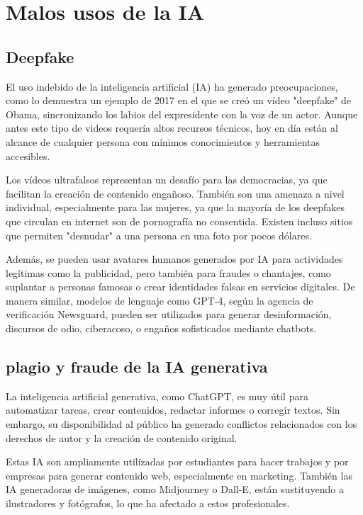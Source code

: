 \documentclass[12pt]{article}
\begin{document}
\section{Malos usos de la IA}

\subsection{Deepfake}

El uso indebido de la inteligencia artificial (IA) ha generado preocupaciones, como lo demuestra un ejemplo de 2017 en el que se creó un vídeo "deepfake" de Obama, sincronizando los labios del expresidente con la voz de un actor. Aunque antes este tipo de videos requería altos recursos técnicos, hoy en día están al alcance de cualquier persona con mínimos conocimientos y herramientas accesibles.

Los vídeos ultrafalsos representan un desafío para las democracias, ya que facilitan la creación de contenido engañoso. También son una amenaza a nivel individual, especialmente para las mujeres, ya que la mayoría de los deepfakes que circulan en internet son de pornografía no consentida. Existen incluso sitios que permiten "desnudar" a una persona en una foto por pocos dólares.

Además, se pueden usar avatares humanos generados por IA para actividades legítimas como la publicidad, pero también para fraudes o chantajes, como suplantar a personas famosas o crear identidades falsas en servicios digitales. De manera similar, modelos de lenguaje como GPT-4, según la agencia de verificación Newsguard, pueden ser utilizados para generar desinformación, discursos de odio, ciberacoso, o engaños sofisticados mediante chatbots.

\subsection{plagio y fraude de la IA generativa}

La inteligencia artificial generativa, como ChatGPT, es muy útil para automatizar tareas, crear contenidos, redactar informes o corregir textos. Sin embargo, su disponibilidad al público ha generado conflictos relacionados con los derechos de autor y la creación de contenido original.

Estas IA son ampliamente utilizadas por estudiantes para hacer trabajos y por empresas para generar contenido web, especialmente en marketing. También las IA generadoras de imágenes, como Midjourney o Dall-E, están sustituyendo a ilustradores y fotógrafos, lo que ha afectado a estos profesionales.
\end{document}
